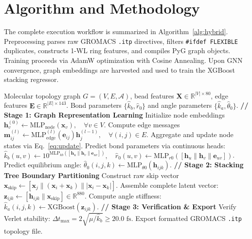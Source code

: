 \documentclass[11pt,a4paper]{article}
\begin{document}
\section{Algorithm and Methodology}
\label{sec:algorithm}

The complete execution workflow is summarized in Algorithm~\ref{alg:hybrid}. Preprocessing parses raw GROMACS \texttt{.itp} directives, filters \texttt{\#ifdef FLEXIBLE} duplicates, constructs 1-WL ring features, and compiles PyG graph objects. Training proceeds via AdamW optimization with Cosine Annealing. Upon GNN convergence, graph embeddings are harvested and used to train the XGBoost stacking regressor.

\begin{algorithm}[htbp]
\caption{End-to-End GNN-Tree Stacking Pipeline}
\label{alg:hybrid}
\begin{algorithmic}[1]
\Require Molecular topology graph $G = (V, E, \mathcal{A})$, bead features $\mathbf{X} \in \mathbb{R}^{|V| \times 80}$, edge features $\mathbf{E} \in \mathbb{R}^{|E| \times 143}$.
\Ensure Bond parameters $\{\hat{k}_b, \hat{r}_0\}$ and angle parameters $\{\hat{k}_a, \hat{\theta}_0\}$.
\State \textbf{// Stage 1: Graph Representation Learning}
\State Initialize node embeddings $\mathbf{h}_v^{(0)} \gets \text{MLP}_{\text{node}}(\mathbf{x}_v), \quad \forall v \in V$.
    \State Compute edge messages $\mathbf{m}_{ij}^{(l)} \gets \text{MLP}_{\text{edge}}^{(l)}(\mathbf{e}_{ij}) \mathbf{h}_j^{(l-1)}, \quad \forall (i, j) \in E$.
    \State Aggregate and update node states via Eq.~\eqref{eq:update}.
\EndFor
\State Predict bond parameters via continuous heads:
\State $\hat{k}_b(u, v) \gets 10^{\text{MLP}_{kb}([\mathbf{h}_u \parallel \mathbf{h}_v \parallel \mathbf{e}_{uv}])}, \quad \hat{r}_0(u, v) \gets \text{MLP}_{r0}([\mathbf{h}_u \parallel \mathbf{h}_v \parallel \mathbf{e}_{uv}])$.
\State Predict equilibrium angle: $\hat{\theta}_0(i, j, k) \gets \text{MLP}_{\theta0}(\mathbf{h}_{ijk})$.
\State \textbf{// Stage 2: Stacking Tree Boundary Partitioning}
\State Construct raw skip vector $\mathbf{x}_{\text{skip}} \gets [\mathbf{x}_j \parallel (\mathbf{x}_i + \mathbf{x}_k) \parallel |\mathbf{x}_i - \mathbf{x}_k|]$.
\State Assemble complete latent vector: $\mathbf{z}_{ijk} \gets [\mathbf{h}_{ijk} \parallel \mathbf{x}_{\text{skip}}] \in \mathbb{R}^{880}$.
\State Compute angle stiffness: $\hat{k}_a(i, j, k) \gets \text{XGBoost}(\mathbf{z}_{ijk})$.
\State \textbf{// Stage 3: Verification \& Export}
\State Verify Verlet stability: $\Delta t_{\max} = 2\sqrt{\mu / \hat{k}_b} \ge 20.0\text{ fs}$.
\State Export formatted GROMACS \texttt{.itp} topology file.
\end{algorithmic}
\end{algorithm}
\end{document}

